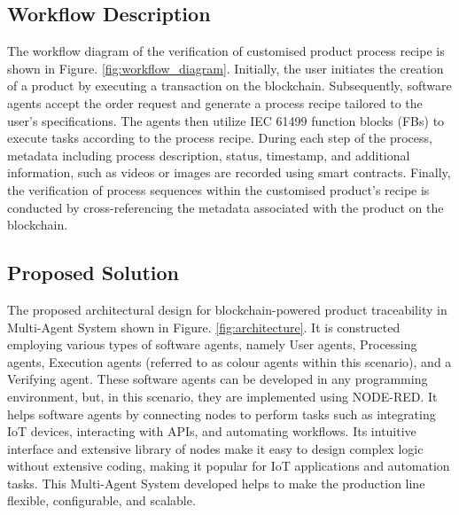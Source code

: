 \begin{bibunit}
\subsection{Workflow Description}

The workflow diagram of the verification of customised product process recipe is shown in Figure. \ref{fig:workflow_diagram}. Initially, the user initiates the creation of a product by executing a transaction on the blockchain. Subsequently, software agents accept the order request and generate a process recipe tailored to the user's specifications. The agents then utilize IEC 61499 function blocks (FBs) to execute tasks according to the process recipe. During each step of the process, metadata including process description, status, timestamp, and additional information, such as videos or images are recorded using smart contracts. Finally, the verification of process sequences within the customised product's recipe is conducted by cross-referencing the metadata associated with the product on the blockchain.


\subsection{Proposed Solution}

The proposed architectural design for blockchain-powered product traceability in Multi-Agent System shown in Figure.  \ref{fig:architecture}. It is constructed employing various types of software agents, namely User agents, Processing agents, Execution agents (referred to as colour agents within this scenario), and a Verifying agent. These software agents can be developed in any programming environment, but, in this scenario, they are implemented using NODE-RED.
It helps software agents by connecting nodes to perform tasks such as integrating IoT devices, interacting with APIs, and automating workflows. Its intuitive interface and extensive library of nodes make it easy to design complex logic without extensive coding, making it popular for IoT applications and automation tasks. This Multi-Agent System developed helps to make the production line flexible, configurable, and scalable.


\end{bibunit}
